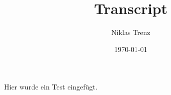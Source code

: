 


\title{Transcript}
\author{Niklas Trenz}
\date{\today}


\maketitle
\tableofcontents

Hier wurde ein Test eingefügt.




